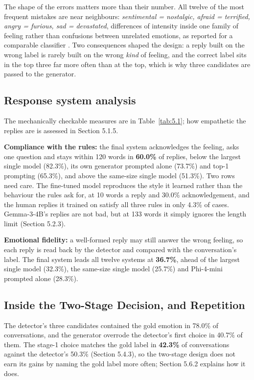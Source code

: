 The shape of the errors matters more than their number. All twelve of the most frequent mistakes are near neighbours: \textit{sentimental = nostalgic, afraid = terrified, angry = furious, sad = devastated}, differences of intensity inside one family of feeling rather than confusions between unrelated emotions, as reported for a comparable classifier \cite{paranjape2020chirpy}. Two consequences shaped the design: a reply built on the wrong label is rarely built on the wrong \textit{kind} of feeling, and the correct label sits in the top three far more often than at the top, which is why three candidates are passed to the generator.

\subsection{Response system analysis}
\label{sec:5.1.3}

The mechanically checkable measures are in Table~\ref{tab:5.1}; how empathetic the replies are is assessed in Section 5.1.5.

\textbf{Compliance with the rules:} the final system acknowledges the feeling, asks one question and stays within 120 words in\textbf{ 60.0\%} of replies, below the largest single model (82.3\%), its own generator prompted alone (73.7\%) and top-1 prompting (65.3\%), and above the same-size single model (51.3\%). Two rows need care. The fine-tuned model reproduces the style it learned rather than the behaviour the rules ask for, at 10 words a reply and 30.0\% acknowledgement, and the human replies it trained on satisfy all three rules in only 4.3\% of cases. Gemma-3-4B's replies are not bad, but at 133 words it simply ignores the length limit (Section 5.2.3).

\textbf{Emotional fidelity:} a well-formed reply may still answer the wrong feeling, so each reply is read back by the detector and compared with the conversation's label. The final system leads all twelve systems at \textbf{36.7\%}, ahead of the largest single model (32.3\%), the same-size single model (25.7\%) and Phi-4-mini prompted alone (28.3\%).

\subsection{Inside the Two-Stage Decision, and Repetition}
\label{sec:5.1.4}

The detector's three candidates contained the gold emotion in 78.0\% of conversations, and the generator overrode the detector's first choice in 40.7\% of them. The stage-1 choice matches the gold label in \textbf{42.3\%} of conversations against the detector's 50.3\% (Section 5.4.3), so the two-stage design does not earn its gains by naming the gold label more often; Section 5.6.2 explains how it does.

